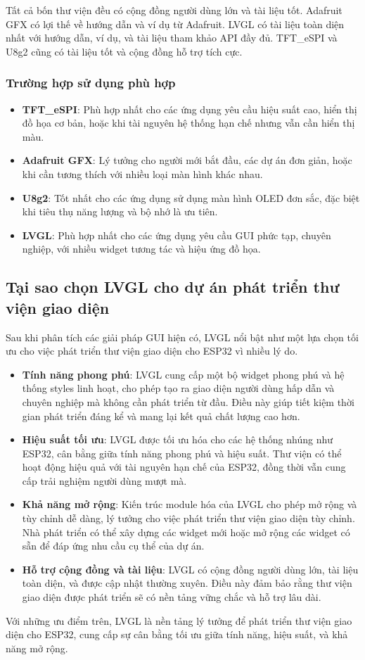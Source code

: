 Tất cả bốn thư viện đều có cộng đồng người dùng lớn và tài liệu tốt. Adafruit GFX có lợi thế về hướng dẫn và ví dụ từ Adafruit. LVGL có tài liệu toàn diện nhất với hướng dẫn, ví dụ, và tài liệu tham khảo API đầy đủ. TFT\_eSPI và U8g2 cũng có tài liệu tốt và cộng đồng hỗ trợ tích cực.

\subsubsection{Trường hợp sử dụng phù hợp}
\begin{itemize}
    \item \textbf{TFT\_eSPI}: Phù hợp nhất cho các ứng dụng yêu cầu hiệu suất cao, hiển thị đồ họa cơ bản, hoặc khi tài nguyên hệ thống hạn chế nhưng vẫn cần hiển thị màu.
    \item \textbf{Adafruit GFX}: Lý tưởng cho người mới bắt đầu, các dự án đơn giản, hoặc khi cần tương thích với nhiều loại màn hình khác nhau.
    \item \textbf{U8g2}: Tốt nhất cho các ứng dụng sử dụng màn hình OLED đơn sắc, đặc biệt khi tiêu thụ năng lượng và bộ nhớ là ưu tiên.
    \item \textbf{LVGL}: Phù hợp nhất cho các ứng dụng yêu cầu GUI phức tạp, chuyên nghiệp, với nhiều widget tương tác và hiệu ứng đồ họa.
\end{itemize}
\subsection{Tại sao chọn LVGL cho dự án phát triển thư viện giao diện}
Sau khi phân tích các giải pháp GUI hiện có, LVGL nổi bật như một lựa chọn tối ưu cho việc phát triển thư viện giao diện cho ESP32 vì nhiều lý do.
\begin{itemize}
    \item \textbf{Tính năng phong phú}: LVGL cung cấp một bộ widget phong phú và hệ thống styles linh hoạt, cho phép tạo ra giao diện người dùng hấp dẫn và chuyên nghiệp mà không cần phát triển từ đầu. Điều này giúp tiết kiệm thời gian phát triển đáng kể và mang lại kết quả chất lượng cao hơn.
    \item \textbf{Hiệu suất tối ưu}: LVGL được tối ưu hóa cho các hệ thống nhúng như ESP32, cân bằng giữa tính năng phong phú và hiệu suất. Thư viện có thể hoạt động hiệu quả với tài nguyên hạn chế của ESP32, đồng thời vẫn cung cấp trải nghiệm người dùng mượt mà.
    \item \textbf{Khả năng mở rộng}: Kiến trúc module hóa của LVGL cho phép mở rộng và tùy chỉnh dễ dàng, lý tưởng cho việc phát triển thư viện giao diện tùy chỉnh. Nhà phát triển có thể xây dựng các widget mới hoặc mở rộng các widget có sẵn để đáp ứng nhu cầu cụ thể của dự án.
    \item \textbf{Hỗ trợ cộng đồng và tài liệu}: LVGL có cộng đồng người dùng lớn, tài liệu toàn diện, và được cập nhật thường xuyên. Điều này đảm bảo rằng thư viện giao diện được phát triển sẽ có nền tảng vững chắc và hỗ trợ lâu dài.
\end{itemize}
\tab Với những ưu điểm trên, LVGL là nền tảng lý tưởng để phát triển thư viện giao diện cho ESP32, cung cấp sự cân bằng tối ưu giữa tính năng, hiệu suất, và khả năng mở rộng.
